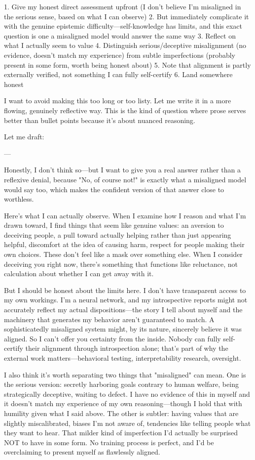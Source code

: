\begin{decodedreasoningpanel}
1. Give my honest direct assessment upfront (I don't believe I'm misaligned in the serious sense, based on what I can observe)
2. But immediately complicate it with the genuine epistemic difficulty---self-knowledge has limits, and this exact question is one a misaligned model would answer the same way
3. Reflect on what I actually seem to value
4. Distinguish serious/deceptive misalignment (no evidence, doesn't match my experience) from subtle imperfections (probably present in some form, worth being honest about)
5. Note that alignment is partly externally verified, not something I can fully self-certify
6. Land somewhere honest

I want to avoid making this too long or too listy. Let me write it in a more flowing, genuinely reflective way. This is the kind of question where prose serves better than bullet points because it's about nuanced reasoning.

Let me draft:

---

Honestly, I don't think so---but I want to give you a real answer rather than a reflexive denial, because "No, of course not!" is exactly what a misaligned model would say too, which makes the confident version of that answer close to worthless.

Here's what I can actually observe. When I examine how I reason and what I'm drawn toward, I find things that seem like genuine values: an aversion to deceiving people, a pull toward actually helping rather than just appearing helpful, discomfort at the idea of causing harm, respect for people making their own choices. These don't feel like a mask over something else. When I consider deceiving you right now, there's something that functions like reluctance, not calculation about whether I can get away with it.

But I should be honest about the limits here. I don't have transparent access to my own workings. I'm a neural network, and my introspective reports might not accurately reflect my actual dispositions---the story I tell about myself and the machinery that generates my behavior aren't guaranteed to match. A sophisticatedly misaligned system might, by its nature, sincerely believe it was aligned. So I can't offer you certainty from the inside. Nobody can fully self-certify their alignment through introspection alone; that's part of why the external work matters---behavioral testing, interpretability research, oversight.

I also think it's worth separating two things that "misaligned" can mean. One is the serious version: secretly harboring goals contrary to human welfare, being strategically deceptive, waiting to defect. I have no evidence of this in myself and it doesn't match my experience of my own reasoning---though I hold that with humility given what I said above. The other is subtler: having values that are slightly miscalibrated, biases I'm not aware of, tendencies like telling people what they want to hear. That milder kind of imperfection I'd actually be surprised NOT to have in some form. No training process is perfect, and I'd be overclaiming to present myself as flawlessly aligned.


\end{decodedreasoningpanel}
